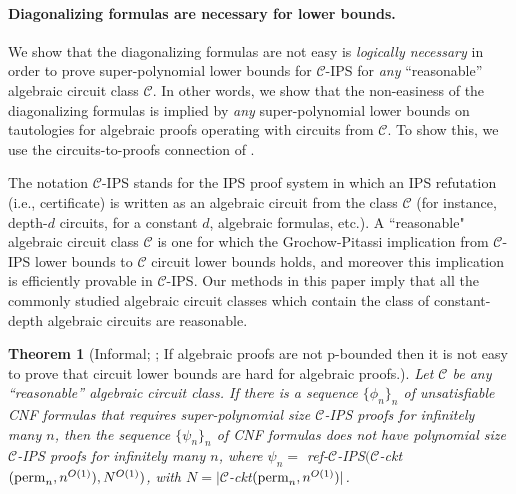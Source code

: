 \documentclass[11pt,letter]{article}
\newtheorem{theorem}{Theorem}[section]
\theoremstyle{remark} %
\newcommand{\perm}{{\rm perm}}
\begin{document}
{\smallskip 




\paragraph{Diagonalizing formulas are necessary for lower bounds.}
 We show that the diagonalizing formulas are not easy %
 is \emph{logically necessary} in order to prove super-polynomial lower bounds for $\mathcal{C}$-IPS for \emph{any} ``reasonable'' algebraic circuit class $\mathcal{C}$. In other words, we show that the non-easiness of the diagonalizing formulas is implied by {\it any} super-polynomial lower bounds on tautologies for algebraic proofs operating with circuits from $\mathcal{C}$. To show this, we use the circuits-to-proofs connection of \cite{GP18}. 
 
 The notation $\mathcal{C}$-IPS stands for the IPS proof system in which an
 IPS refutation (i.e., certificate) is written as an algebraic circuit from the class $\mathcal{C}$ (for instance, depth-$d$ circuits, for a constant $d$,  algebraic formulas, etc.). A ``reasonable" algebraic circuit class $\mathcal{C}$ is one for which the Grochow-Pitassi implication from $\mathcal{C}$-IPS lower bounds to $\mathcal{C}$ circuit lower bounds holds, and moreover this implication is efficiently provable in $\mathcal{C}$-IPS. Our methods in this paper imply that all the commonly studied algebraic circuit classes which contain the class of constant-depth algebraic circuits are reasonable.

 \begin{theorem}[Informal; ; If algebraic proofs are not p-bounded then it is not easy to prove that circuit lower bounds are hard for algebraic proofs.]
%
    \label{thm:mainthm3}
    Let $\mathcal{C}$ be any ``reasonable'' algebraic circuit class. If there is a sequence $\{\phi_n\}_n$ of unsatisfiable CNF formulas that requires super-polynomial size $\mathcal{C}$-\textup{IPS} proofs for infinitely many $n$, then the sequence $\{\psi_n\}_n$ of CNF formulas does not have polynomial size $\mathcal{C}$-{\textup {IPS}} proofs for infinitely many $n$, where $\psi_n = $ {\rm ref}-$\mathcal{C}$-{\textup {IPS}}$(\mathcal{C}$-\textup{ckt}$(\perm_n, n^{O(1)}), N^{O(1)})$, with $N = |\mathcal{C}$-{\rm ckt}$(\perm_n, n^{O(1)})|$.
 \end{theorem}

}
\end{document}
